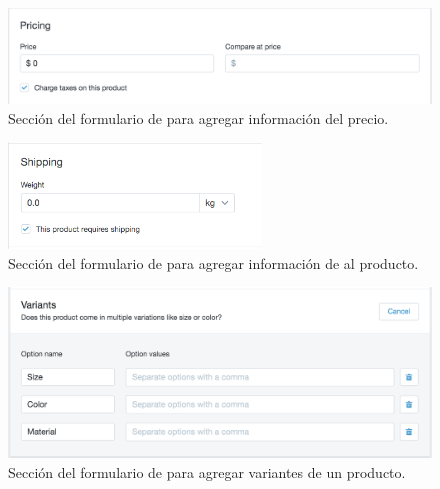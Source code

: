 \begin{figure}[H]
	\centering
	\includegraphics[width=1\textwidth]{figuras/productos/examples/shopify_product_princing.png}
	\caption{Sección del formulario de \shopifyNAME para agregar información del precio.}
	\label{figure:productos:example:shopify_product_princing}
\end{figure}

\begin{figure}[H]
	\centering
	\includegraphics[width=0.6\textwidth]{figuras/productos/examples/shopify_product_shipping.png}
	\caption{Sección del formulario de \shopifyNAME para agregar información de \shipping al producto.}
	\label{figure:productos:example:shopify_product_shipping}
\end{figure}


\begin{figure}[H]
	\centering
	\includegraphics[width=1\textwidth]{figuras/productos/examples/shopify_product_variant_max.png}
	\caption{Sección del formulario de \shopifyNAME para agregar variantes de un producto.}
	\label{figure:productos:example:shopify_product_variant_max}
\end{figure}

